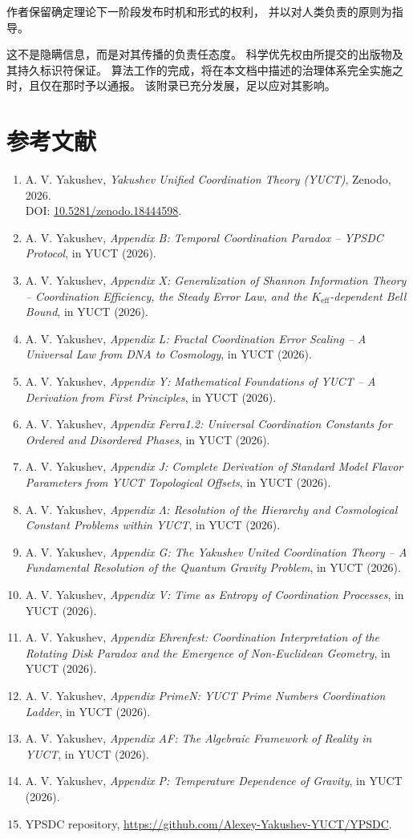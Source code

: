 \documentclass[11pt,a4paper]{article}
\begin{document}
	作者保留确定理论下一阶段发布时机和形式的权利，
	并以对人类负责的原则为指导。
	
	这不是隐瞒信息，而是对其传播的负责任态度。
	科学优先权由所提交的出版物及其持久标识符保证。
	算法工作的完成，将在本文档中描述的治理体系完全实施之时，且仅在那时予以通报。
	该附录已充分发展，足以应对其影响。
	
	\section*{参考文献}
	\begin{enumerate}
		\item A. V. Yakushev, \emph{Yakushev Unified Coordination Theory (YUCT)}, Zenodo, 2026. \\ DOI: \href{https://doi.org/10.5281/zenodo.18444598}{10.5281/zenodo.18444598}.
		\item A. V. Yakushev, \emph{Appendix B: Temporal Coordination Paradox – YPSDC Protocol}, in YUCT (2026).
		\item A. V. Yakushev, \emph{Appendix X: Generalization of Shannon Information Theory – Coordination Efficiency, the Steady Error Law, and the \(K_{\mathrm{eff}}\)-dependent Bell Bound}, in YUCT (2026).
		\item A. V. Yakushev, \emph{Appendix L: Fractal Coordination Error Scaling – A Universal Law from DNA to Cosmology}, in YUCT (2026).
		\item A. V. Yakushev, \emph{Appendix Y: Mathematical Foundations of YUCT – A Derivation from First Principles}, in YUCT (2026).
		\item A. V. Yakushev, \emph{Appendix Ferra1.2: Universal Coordination Constants for Ordered and Disordered Phases}, in YUCT (2026).
		\item A. V. Yakushev, \emph{Appendix J: Complete Derivation of Standard Model Flavor Parameters from YUCT Topological Offsets}, in YUCT (2026).
		\item A. V. Yakushev, \emph{Appendix \(\Lambda\): Resolution of the Hierarchy and Cosmological Constant Problems within YUCT}, in YUCT (2026).
		\item A. V. Yakushev, \emph{Appendix G: The Yakushev United Coordination Theory – A Fundamental Resolution of the Quantum Gravity Problem}, in YUCT (2026).
		\item A. V. Yakushev, \emph{Appendix V: Time as Entropy of Coordination Processes}, in YUCT (2026).
		\item A. V. Yakushev, \emph{Appendix Ehrenfest: Coordination Interpretation of the Rotating Disk Paradox and the Emergence of Non-Euclidean Geometry}, in YUCT (2026).
		\item A. V. Yakushev, \emph{Appendix PrimeN: YUCT Prime Numbers Coordination Ladder}, in YUCT (2026).
		\item A. V. Yakushev, \emph{Appendix AF: The Algebraic Framework of Reality in YUCT}, in YUCT (2026).
		\item A. V. Yakushev, \emph{Appendix P: Temperature Dependence of Gravity}, in YUCT (2026).
		\item YPSDC repository, \url{https://github.com/Alexey-Yakushev-YUCT/YPSDC}.
	\end{enumerate}
	
\end{document}
